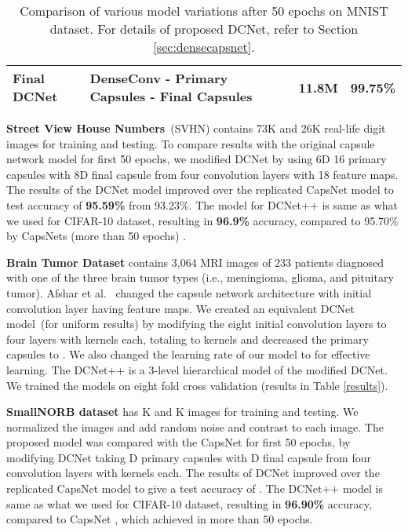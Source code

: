 \documentclass{bmvc2k}
\begin{document}
\begin{table}[!htbp]
{{\begin{tabular}{@{}|l|l|l|l|@{}}
\multicolumn{1}{|l|}{Final DCNet}       & \multicolumn{1}{l|}{DenseConv - Primary Capsules - Final Capsules}                                                                                                                                           & \multicolumn{1}{l|}{11.8M} & \multicolumn{1}{l|}{\textbf{99.75\%}} \\ \hline
\end{tabular}
}
}
\vspace{1mm}
\caption{Comparison of various model variations after 50 epochs on MNIST dataset. For details of proposed DCNet, refer to Section \ref{sec:densecapsnet}.}
\label{param}
\end{table}

 \textbf{Street View House Numbers}~(SVHN) contains 73K and 26K real-life digit images for training and testing. To compare results with the original capsule network model \cite{capsnet} for first 50 epochs, we modified DCNet by using 6D 16 primary capsules with 8D final capsule from four convolution layers with 18 feature maps. The results of the DCNet model improved over the replicated CapsNet model to test accuracy of \textbf{95.59\%} from 93.23\%. The model for DCNet++ is same as what we used for CIFAR-10 dataset, resulting in \textbf{96.9\%} accuracy, compared to 95.70\% by CapsNets (more than 50 epochs) \cite{capsnet}.
 
 \textbf{Brain Tumor Dataset} contains 3,064 MRI images of 233 patients diagnosed with one of the three brain tumor types (i.e., meningioma, glioma, and pituitary tumor). Afshar et al.\ \cite{capsulepapertumor} changed the capsule network architecture with initial convolution layer having  feature maps. We created an equivalent DCNet model~(for uniform results) by modifying the eight initial convolution layers to four layers with  kernels each, totaling to  kernels and decreased the primary capsules to . We also changed the learning rate of our model to  for effective learning. The DCNet++ is a 3-level hierarchical model of the modified DCNet. We trained the models on eight fold cross validation (results in Table \ref{results}).

 \textbf{SmallNORB dataset} has K and K images for training and testing. We normalized the images and add random noise and contrast to each image. The proposed model was compared with the CapsNet \cite{capsnet} for first 50 epochs, by modifying DCNet taking D  primary capsules with D final capsule from four convolution layers with  kernels each. The results of DCNet improved over the replicated CapsNet model to give a test accuracy of . The DCNet++ model is same as what we used for CIFAR-10 dataset, resulting in \textbf{96.90\%} accuracy, compared to CapsNet \cite{capsnet}, which achieved  in more than 50 epochs.
 
\end{document}
